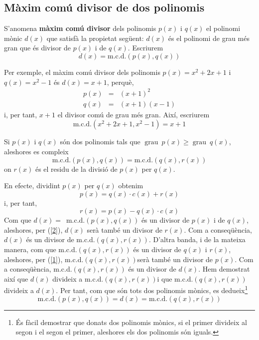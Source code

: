 \subsection{Màxim comú divisor de dos polinomis}

S'anomena \textbf{màxim comú divisor} dels polinomis $p(x)$ i $q(x)$ el polinomi mònic $d(x)$ que satisfà la propietat següent: $d(x)$ és el polinomi de grau més gran que és divisor de $p(x)$ i de $q(x)$.
Escriurem\begin{equation*}
d(x)=\text{m.c.d.}\left( p(x),q(x)\right)
\end{equation*}

Per exemple, el màxim comú divisor dels polinomis $p(x)=x^{2}+2x+1$ i $q(x)=x^{2}-1$ és $d(x)=x+1$, perquè,\begin{eqnarray*}
p(x) &=&(x+1)^{2} \\
q(x) &=&(x+1)(x-1)
\end{eqnarray*}i, per tant, $x+1$ el divisor comú de grau més gran. Així,
escriurem\begin{equation*}
\text{m.c.d.}\left( x^{2}+2x+1,x^{2}-1\right) =x+1
\end{equation*}

Si $p(x)$ i $q(x)$ són dos polinomis tals que $\operatorname{grau}~p(x)\geq $$\operatorname{grau}~q(x)$, aleshores es compleix\begin{equation*}
\text{m.c.d.}\left( p(x),q(x)\right) =\text{m.c.d.}\left( q(x),r(x)\right)
\end{equation*}on $r(x)$ és el residu de la divisió de $p(x)$ per $q(x)$.

En efecte, dividint $p(x)$ per $q(x)$ obtenim\begin{equation}
p(x)=q(x)\cdot c(x)+r(x) \label{1}
\end{equation}i, per tant,\begin{equation}
r(x)=p(x)-q(x)\cdot c(x) \label{2}
\end{equation}Com que $d(x)=$~m.c.d.$\left( p(x),q(x)\right) $ és un divisor de $p(x)$
i de $q(x)$, aleshores, per (\ref{2}), $d(x)$ serà també un divisor
de $r(x)$. Com a conseqüència, $d(x)$ és un divisor de m.c.d.$\left(
q(x),r(x)\right) $. D'altra banda, i de la mateixa manera, com que m.c.d.$\left(
q(x),r(x)\right) $ és un divisor de $q(x)$ i $r(x)$, aleshores, per (\ref{1}), m.c.d.$\left( q(x),r(x)\right) $serà també un divisor de $p(x)$. Com a conseqüència, m.c.d.$\left( q(x),r(x)\right) $ és un divisor de $d(x)$. Hem demostrat així que $d(x)$ divideix a m.c.d.$\left(
q(x),r(x)\right) $i que m.c.d.$\left( q(x),r(x)\right) $divideix a $d(x)$.
Per tant, com que són tots dos polinomis mònics, es dedueix\footnote{És fàcil demostrar que donats dos polinomis mònics, si el primer
divideix al segon i el segon el primer, aleshores els dos polinomis són
iguals.}\begin{equation*}
\text{m.c.d.}\left( p(x),q(x)\right) =d(x)=\text{m.c.d.}\left(
q(x),r(x)\right)
\end{equation*}

